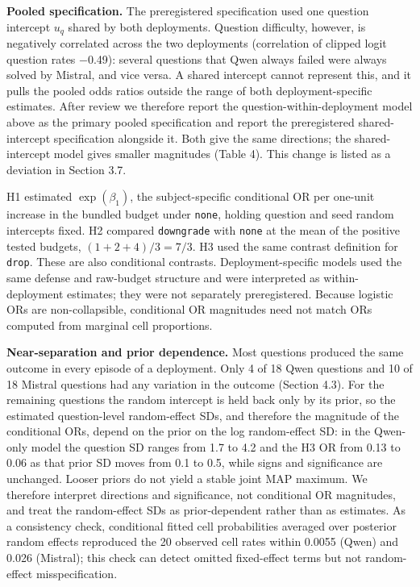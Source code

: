 \documentclass[11pt]{article}
\begin{document}
\textbf{Pooled specification.} The preregistered specification used one question intercept \(u_q\) shared by both deployments. Question difficulty, however, is negatively correlated across the two deployments (correlation of clipped logit question rates −0.49): several questions that Qwen always failed were always solved by Mistral, and vice versa. A shared intercept cannot represent this, and it pulls the pooled odds ratios outside the range of both deployment-specific estimates. After review we therefore report the question-within-deployment model above as the primary pooled specification and report the preregistered shared-intercept specification alongside it. Both give the same directions; the shared-intercept model gives smaller magnitudes (Table 4). This change is listed as a deviation in Section 3.7.

H1 estimated \(\exp(\beta_1)\), the subject-specific conditional OR per one-unit increase in the bundled budget under \texttt{none}, holding question and seed random intercepts fixed. H2 compared \texttt{downgrade} with \texttt{none} at the mean of the positive tested budgets, \((1+2+4)/3=7/3\). H3 used the same contrast definition for \texttt{drop}. These are also conditional contrasts. Deployment-specific models used the same defense and raw-budget structure and were interpreted as within-deployment estimates; they were not separately preregistered. Because logistic ORs are non-collapsible, conditional OR magnitudes need not match ORs computed from marginal cell proportions.

\textbf{Near-separation and prior dependence.} Most questions produced the same outcome in every episode of a deployment. Only 4 of 18 Qwen questions and 10 of 18 Mistral questions had any variation in the outcome (Section 4.3). For the remaining questions the random intercept is held back only by its prior, so the estimated question-level random-effect SDs, and therefore the magnitude of the conditional ORs, depend on the prior on the log random-effect SD: in the Qwen-only model the question SD ranges from 1.7 to 4.2 and the H3 OR from 0.13 to 0.06 as that prior SD moves from 0.1 to 0.5, while signs and significance are unchanged. Looser priors do not yield a stable joint MAP maximum. We therefore interpret directions and significance, not conditional OR magnitudes, and treat the random-effect SDs as prior-dependent rather than as estimates. As a consistency check, conditional fitted cell probabilities averaged over posterior random effects reproduced the 20 observed cell rates within 0.0055 (Qwen) and 0.026 (Mistral); this check can detect omitted fixed-effect terms but not random-effect misspecification.
\end{document}
